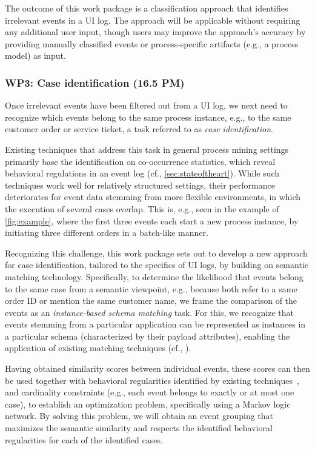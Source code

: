 The outcome of this work package is a classification approach that identifies irrelevant events in a UI log. The approach will be applicable without requiring any additional user input, though users may improve the approach's accuracy by providing manually classified events or process-specific artifacts (e.g., a process model) as input.

\subsubsection{WP3: Case identification (16.5 PM)}
\label{sec:wp3}

Once irrelevant events have been filtered out from  a UI log, we next need to recognize which events belong to the same process instance, e.g., to the same customer order or service ticket, a task referred to as \emph{case identification}.

Existing techniques that address this task in general process mining settings primarily base the identification on co-occurrence statistics, which reveal behavioral regulations in an event log (cf., \autoref{sec:stateoftheart}). While such techniques work well for relatively structured settings, their performance deteriorates for event data stemming from more flexible environments, in which the execution of several cases overlap. This is, e.g., seen in the example of \autoref{fig:example}, where the first three events each start a new process instance, by initiating three different orders in a batch-like manner.

Recognizing this challenge, this work package sets out to develop a new approach for case identification, tailored to the specifics of UI logs, by building on semantic matching technology.
Specifically, to determine the likelihood that events belong to the same case from a semantic viewpoint, e.g., because both refer to a same order ID or mention the same customer name, we frame the comparison of the events as an \emph{instance-based schema matching} task. For this, we recognize that events stemming from a particular application can be represented as instances in a particular schema (characterized by their payload attributes), enabling the application of existing matching techniques (cf., \cite{rinaldi2018matching,lehmberg2017stitching}).

 Having obtained similarity scores between individual events, these scores can then be used together with behavioral regularities identified by existing techniques~\cite{diba2020extraction,ferreira2009discovering}, and cardinality constraints (e.g., each event belongs to exactly or at most one case), to establish an optimization problem, specifically using a Markov logic network. By solving this problem, we will obtain an event grouping that maximizes the semantic similarity and respects the identified behavioral regularities for each of the identified cases.

